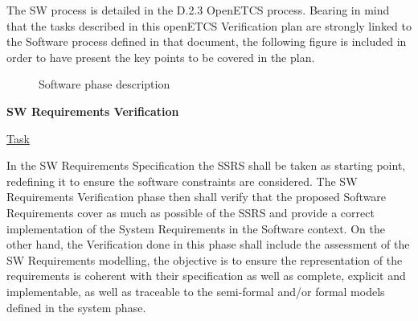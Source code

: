 \documentclass{template/openetcs_report}
\begin{document}
The SW process is detailed in the D.2.3 OpenETCS process. Bearing in mind that the tasks described in this openETCS Verification plan are strongly linked to the Software process defined in that document, the following figure is included in order to have present the key points to be covered in the plan.

\begin{figure}[h]
  \centering
  \caption{Software phase description}
  \label{fig:detailed software}
\end{figure}

\textbf{SW Requirements Verification}

\underline{Task} 

In the SW Requirements Specification the SSRS shall be taken as starting point, redefining it to ensure the software constraints are considered. 
The SW Requirements Verification phase then shall verify that the proposed Software Requirements cover as much as possible of the SSRS and provide a correct implementation of the System Requirements in the Software context.
On the other hand, the Verification done in this phase shall include the assessment of the SW Requirements modelling, the objective is to ensure the representation of the requirements is coherent with their specification as well as complete, explicit and implementable, as well as traceable to the semi-formal and/or formal models defined in the system phase.
\end{document}
